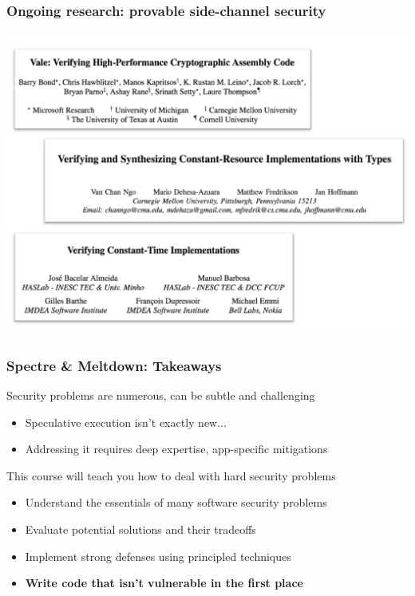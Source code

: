 \documentclass[10pt,handout]{beamer}
\begin{document}

\begin{frame}

\frametitle{Ongoing research: provable side-channel security}

\centering
\includegraphics[width=\textwidth]{sidechan-papers.pdf}

\end{frame}


\begin{frame}

\frametitle{Spectre \& Meltdown: Takeaways}

Security problems are numerous, can be subtle and challenging
\begin{itemize}
  \item Speculative execution isn't exactly new...
  \item Addressing it requires deep expertise, app-specific mitigations \\[2em]
\end{itemize}

\pause
This course will teach you how to deal with hard security problems
\begin{itemize}
  \item Understand the essentials of many software security problems
  \item Evaluate potential solutions and their tradeoffs
  \item Implement strong defenses using principled techniques
  \item \textbf{Write code that isn't vulnerable in the first place}
\end{itemize}

\end{frame}
\end{document}
